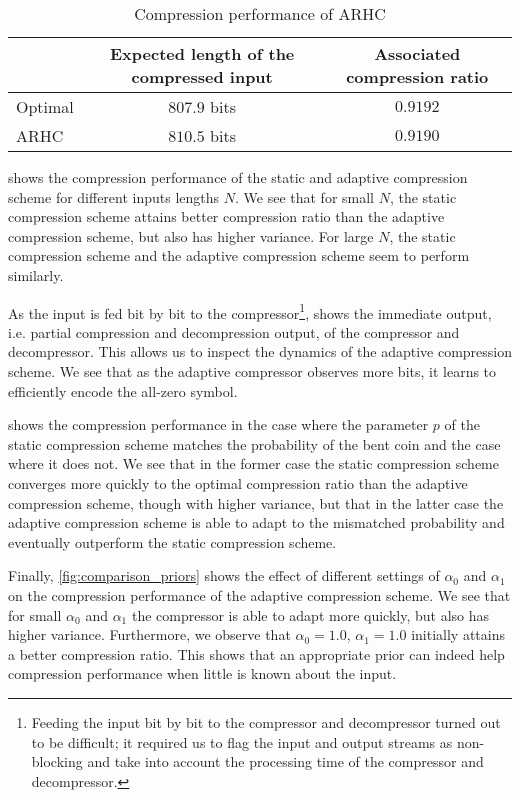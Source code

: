 \documentclass[letterpaper,11pt]{extarticle}
\begin{document}
\begin{table}[ht]
    \centering
    \begin{tabular}{l|cc}
        \toprule
        & Expected length of the compressed input & Associated compression ratio \\ \midrule
        Optimal & $807.9$ bits & $0.9192$ \\
        ARHC & $810.5$ bits & $0.9190$ \\ \bottomrule
    \end{tabular}
    \caption{Compression performance of ARHC}
    \label{tab:compression_performance}
\end{table}

 shows the compression performance of the static and adaptive compression scheme for different inputs lengths $N$. We see that for small $N$, the static compression scheme attains better compression ratio than the adaptive compression scheme, but also has higher variance. For large $N$, the static compression scheme and the adaptive compression scheme seem to perform similarly.

As the input is fed bit by bit to the compressor\footnote{Feeding the input bit by bit to the compressor and decompressor turned out to be difficult; it required us to flag the input and output streams as non-blocking and take into account the processing time of the compressor and decompressor.},  shows the immediate output, i.e. partial compression and decompression output, of the compressor and decompressor. This allows us to inspect the dynamics of the adaptive compression scheme. We see that as the adaptive compressor observes more bits, it learns to efficiently encode the all-zero symbol.

 shows the compression performance in the case where the parameter $p$ of the static compression scheme matches the probability of the bent coin and the case where it does not. We see that in the former case the static compression scheme converges more quickly to the optimal compression ratio than the adaptive compression scheme, though with higher variance, but that in the latter case the adaptive compression scheme is able to adapt to the mismatched probability and eventually outperform the static compression scheme.

Finally, \cref{fig:comparison_priors} shows the effect of different settings of $\alpha_0$ and $\alpha_1$ on the compression performance of the adaptive compression scheme. We see that for small $\alpha_0$ and $\alpha_1$ the compressor is able to adapt more quickly, but also has higher variance. Furthermore, we observe that $\alpha_0=1.0$, $\alpha_1=1.0$ initially attains a better compression ratio. This shows that an appropriate prior can indeed help compression performance when little is known about the input.
\end{document}
